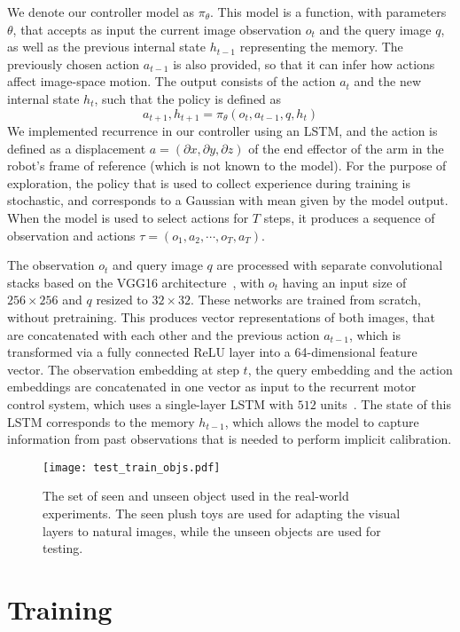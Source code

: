\documentclass[10pt,twocolumn,letterpaper]{article}
\begin{document}
We denote our controller model as $\pi_\theta$. This model is a function, with parameters $\theta$, that accepts as input the current image observation $o_t$ and the query image $q$, as well as the previous internal state $h_{t-1}$ representing the memory. The previously chosen action $a_{t-1}$ is also provided, so that it can infer how actions affect image-space motion. The output consists of the action $a_t$ and the new internal state $h_t$, such that the policy is defined as
\begin{equation}\label{eq:model}
a_{t+1}, h_{t+1} = \pi_{\theta}(o_t, a_{t-1}, q, h_t) 
\end{equation}
We implemented recurrence in our controller using an LSTM, and the action is defined as a displacement $a=(\partial x, \partial y, \partial z)$ of the end effector of the arm in the robot's frame of reference (which is not known to the model). For the purpose of exploration, the policy that is used to collect experience during training is stochastic, and corresponds to a Gaussian with mean given by the model output. When the model is used to select actions for $T$ steps, it produces a sequence of observation and actions $\tau=(o_1, a_2, \cdots, o_T, a_T)$. 

The observation $o_t$ and query image $q$ are processed with separate convolutional stacks based on the VGG16 architecture~\cite{simonyan2014very}, with $o_t$ having an input size of $256 \times 256$ and $q$ resized to $32 \times 32$. These networks are trained from scratch, without pretraining. This produces vector representations of both images, that are concatenated with each other and the previous action $a_{t-1}$, which is transformed via a fully connected ReLU layer into a 64-dimensional feature vector. The observation embedding at step $t$, the query embedding and the action embeddings are concatenated in one vector as input to the recurrent motor control system, which uses a single-layer LSTM with $512$ units~\cite{hochreiter1997long}. The state of this LSTM corresponds to the memory $h_{t-1}$, which allows the model to capture information from past observations that is needed to perform implicit calibration.

\begin{figure}
\begin{center}
\texttt{[image: test\_train\_objs.pdf]}
\end{center}
\vspace{-.15in}
   \caption{The set of seen and unseen object used in the real-world experiments. The seen plush toys are used for adapting the visual layers to natural images, while the unseen objects are used for testing.}
\label{fig:test_objects}
\vspace{-.15in}
\end{figure}\section{Training}\label{sec:training}
\end{document}
